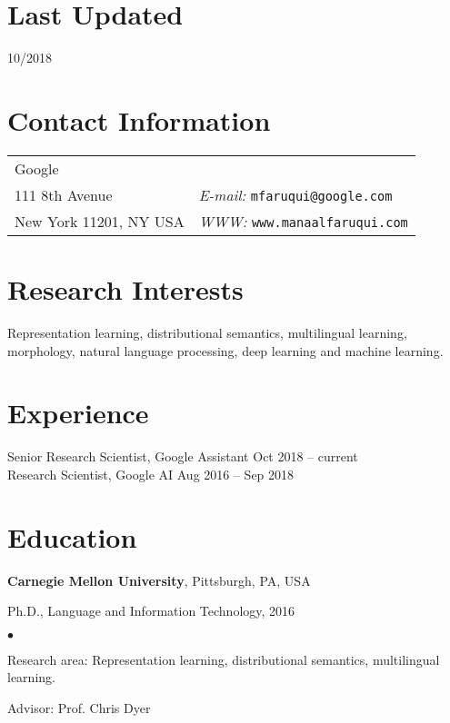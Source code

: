 \documentclass[margin,line]{res}
\newenvironment{list1}{
  \begin{list}{\ding{113}}{%
      \setlength{\itemsep}{0in}
      \setlength{\parsep}{0in} \setlength{\parskip}{0in}
      \setlength{\topsep}{0in} \setlength{\partopsep}{0in}
      \setlength{\leftmargin}{0.17in}}}{\end{list}}
\newenvironment{list2}{
  \begin{list}{$\bullet$}{%
      \setlength{\itemsep}{0in}
      \setlength{\parsep}{0in} \setlength{\parskip}{0in}
      \setlength{\topsep}{0in} \setlength{\partopsep}{0in}
      \setlength{\leftmargin}{0.2in}}}{\end{list}}
\begin{document}

\begin{resume}

\section{\sc Last Updated}

10/2018

\section{\sc Contact Information}
\vspace{.05in}
\begin{tabular}{@{}p{2in}p{4in}}
Google & \\
111 8th Avenue & {\it E-mail:}  \tt{mfaruqui@google.com}\\
New York 11201, NY USA &  {\it WWW:}  \tt{www.manaalfaruqui.com}\\
\end{tabular}

\section{\sc Research Interests}

Representation learning, distributional semantics, multilingual learning,
morphology, natural language processing, deep learning and machine learning.

\section{\sc Experience}
Senior Research Scientist, Google Assistant \hfill {Oct 2018 -- current}\\
Research Scientist, Google AI \hfill {Aug 2016 -- Sep 2018}\\

\section{\sc Education}
{\bf Carnegie Mellon University}, Pittsburgh, PA, USA\\
\vspace*{-.1in}
\begin{list1}
\item[] Ph.D., Language and Information Technology, 2016
\begin{list2}
\vspace*{.05in}
\item Research area: Representation learning, distributional semantics, multilingual learning.
\item Advisor:  Prof. Chris Dyer
\end{list2}
\end{list1}


\end{resume}
\end{document}
